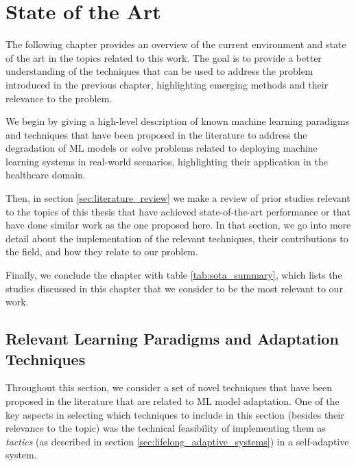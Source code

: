 \documentclass[../main.tex]{subfiles}
\begin{document}
    \chapter{State of the Art} \label{chap:state_of_the_art} 

    The following chapter provides an overview of the current environment and state of the art in the topics related to this work. The goal is to provide a better understanding of the techniques that can be used to address the problem introduced in the previous chapter, highlighting emerging methods and their relevance to the problem.
    
    We begin by giving a high-level description of known machine learning paradigms and techniques that have been proposed in the literature to address the degradation of ML models or solve problems related to deploying machine learning systems in real-world scenarios, highlighting their application in the healthcare domain.
    
    Then, in section \ref{sec:literature_review} we make a review of prior studies relevant to the topics of this thesis that have achieved state-of-the-art performance or that have done similar work as the one proposed here. In that section, we go into more detail about the implementation of the relevant techniques, their contributions to the field, and how they relate to our problem.

    Finally, we conclude the chapter with table \ref{tab:sota_summary}, which lists the studies discussed in this chapter that we consider to be the most relevant to our work. 

    \section{Relevant Learning Paradigms and Adaptation Techniques} \label{sec:relevant_techniques} 

    Throughout this section, we consider a set of novel techniques that have been proposed in the literature that are related to ML model adaptation. One of the key aspects in selecting which techniques to include in this section (besides their relevance to the topic) was the technical feasibility of implementing them as \textit{tactics} (as described in section \ref{sec:lifelong_adaptive_systems}) in a self-adaptive system. 
\end{document}
